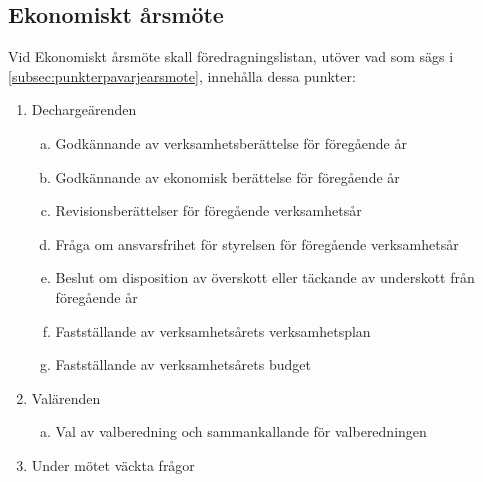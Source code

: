	\subsection{Ekonomiskt årsmöte}
	\label{subsec:ekonomisktarsmote}
		Vid Ekonomiskt årsmöte skall föredragningslistan, utöver vad som sägs i \ref{subsec:punkterpavarjearsmote}, innehålla dessa punkter: 
		\begin{enumerate}[1.]
		\setlength{\itemsep}{0.0cm}
		\setlength{\parskip}{0.0cm}
		\setcounter{enumi}{3}
			\item Dechargeärenden
			\begin{enumerate}[a.]
			\setlength{\itemsep}{0.0cm}
			\setlength{\parskip}{0.0cm}
				\item Godkännande av verksamhetsberättelse för föregående år
				\item Godkännande av ekonomisk berättelse för föregående år
				\item Revisionsberättelser för föregående verksamhetsår
				\item Fråga om ansvarsfrihet för styrelsen för föregående verksamhetsår
				\item Beslut om disposition av överskott eller täckande av underskott från föregående år
				\item Fastställande av verksamhetsårets verksamhetsplan
				\item Fastställande av verksamhetsårets budget
				\end{enumerate}
			\item Valärenden
			\begin{enumerate}[a.]
			\setlength{\itemsep}{0.0cm}
			\setlength{\parskip}{0.0cm}
				\item Val av valberedning och sammankallande för valberedningen
				\end{enumerate}
		\setcounter{enumi}{5}
			\item Under mötet väckta frågor
			\end{enumerate}

\clearpage
